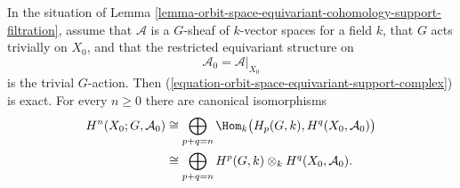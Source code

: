 \begin{lemma}
\label{lemma-orbit-space-equivariant-cohomology-trivial-fixed-part}
\begin{reference}
\cite[Chapter V, \S 5.4, Corollary 5.4.1, p. 206]{Tohoku}
\end{reference}
In the situation of Lemma
\ref{lemma-orbit-space-equivariant-cohomology-support-filtration}, assume
that $\mathcal{A}$ is a $G$-sheaf of $k$-vector spaces for a field $k$,
that $G$ acts trivially on $X_0$, and that the restricted equivariant
structure on
$$
\mathcal{A}_0=\mathcal{A}|_{X_0}
$$
is the trivial $G$-action. Then
(\ref{equation-orbit-space-equivariant-support-complex}) is exact. For every
$n\geq 0$ there are canonical isomorphisms
$$
\begin{aligned}
H^n(X_0;G,\mathcal{A}_0)
&\cong
\bigoplus_{p+q=n}
\Hom_k\bigl(H_p(G,k),H^q(X_0,\mathcal{A}_0)\bigr)\\
&\cong
\bigoplus_{p+q=n}
H^p(G,k)\otimes_k H^q(X_0,\mathcal{A}_0).
\end{aligned}
$$
\end{lemma}

